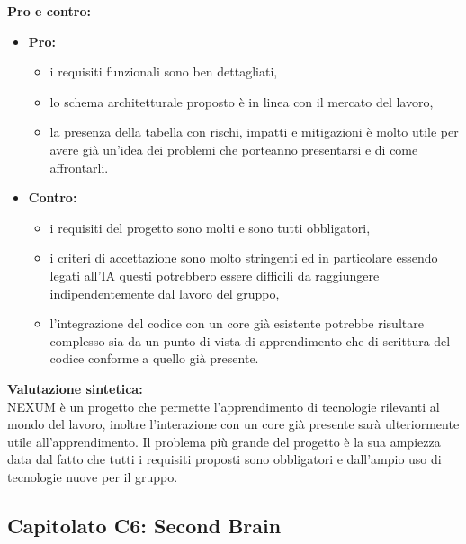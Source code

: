 \vspace{0.3cm}
\textbf{Pro e contro:}
\begin{itemize}
	\item \textbf{Pro:}
        \begin{itemize}
            \item i requisiti funzionali sono ben dettagliati,
            \item lo schema architetturale proposto è in linea con il mercato del lavoro,
            \item la presenza della tabella con rischi, impatti e mitigazioni è molto utile per avere già un'idea dei problemi che porteanno presentarsi e di come affrontarli.
        \end{itemize}
	\item \textbf{Contro:}
        \begin{itemize}
            \item i requisiti del progetto sono molti e sono tutti obbligatori,
            \item i criteri di accettazione sono molto stringenti ed in particolare essendo legati all'IA questi potrebbero essere difficili da raggiungere indipendentemente dal lavoro del gruppo,
            \item l'integrazione del codice con un core già esistente potrebbe risultare complesso sia da un punto di vista di apprendimento che di scrittura del codice conforme a quello già presente.
        \end{itemize}
\end{itemize}

\vspace{0.3cm}
\textbf{Valutazione sintetica:} \\
NEXUM è un progetto che permette l'apprendimento di tecnologie rilevanti al mondo del lavoro, inoltre l'interazione con un core già presente sarà ulteriormente utile all'apprendimento. Il problema più grande del progetto è la sua ampiezza data dal fatto che tutti i requisiti proposti sono obbligatori e dall'ampio uso di tecnologie nuove per il gruppo.

\vspace{0.5cm}

\vspace{0.5cm}

\subsection{Capitolato C6: {Second Brain} }

